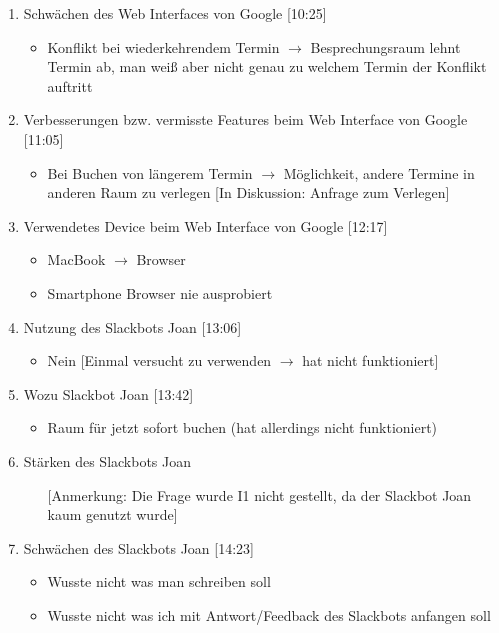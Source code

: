 \begin{enumerate}
    \item Schwächen des Web Interfaces von Google [10:25]
    \begin{itemize}
        \item Konflikt bei wiederkehrendem Termin $\rightarrow$ Besprechungsraum lehnt Termin ab, man weiß aber nicht genau zu welchem Termin der Konflikt auftritt
    \end{itemize}
    
    \item Verbesserungen bzw. vermisste Features beim Web Interface von Google [11:05]
    \begin{itemize}
        \item Bei Buchen von längerem Termin $\rightarrow$ Möglichkeit, andere Termine in anderen Raum zu verlegen [In Diskussion: Anfrage zum Verlegen]
    \end{itemize}
    
    \item Verwendetes Device beim Web Interface von Google [12:17]
    \begin{itemize}
        \item MacBook $\rightarrow$ Browser 
        \item Smartphone Browser nie ausprobiert
    \end{itemize}
    
    \item Nutzung des Slackbots Joan [13:06]
    \begin{itemize}
        \item Nein [Einmal versucht zu verwenden $\rightarrow$ hat nicht funktioniert]
    \end{itemize}
    
    \item Wozu Slackbot Joan [13:42]
    \begin{itemize}
        \item Raum für jetzt sofort buchen (hat allerdings nicht funktioniert)
    \end{itemize}
    
    \item Stärken des Slackbots Joan
    \begin{itemize}
        \item[] [Anmerkung: Die Frage wurde I1 nicht gestellt, da der Slackbot Joan kaum genutzt wurde]
    \end{itemize}
    
    \item Schwächen des Slackbots Joan [14:23]
    \begin{itemize}
        \item Wusste nicht was man schreiben soll
        \item Wusste nicht was ich mit Antwort/Feedback des Slackbots anfangen soll
    \end{itemize}
    

\end{enumerate}
